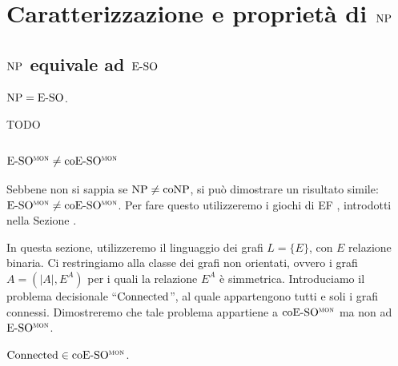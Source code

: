 \chapter{Caratterizzazione e proprietà di $\operatorname{NP}$}

\section{$\operatorname{NP}$ equivale ad $\operatorname{E-SO}$}

\begin{teorema}[Fagin]
  \label{thm:np-eso}
  $\operatorname{NP} = \operatorname{E-SO}$.
\end{teorema}


TODO


\section{$\operatorname{E-SO^{\normalfont\textsc{mon}}} \neq \operatorname{coE-SO^{\normalfont\textsc{mon}}}$}

Sebbene non si sappia se $\operatorname{NP}\neq\operatorname{coNP}$, si può dimostrare un risultato simile: $\operatorname{E-SO^{\normalfont\textsc{mon}}} \neq \operatorname{coE-SO^{\normalfont\textsc{mon}}}$.
Per fare questo utilizzeremo i giochi di EF , introdotti nella Sezione .

% 

In questa sezione, utilizzeremo il linguaggio dei grafi $L=\{E\}$, con $E$ relazione binaria.
Ci restringiamo alla classe dei grafi non orientati, ovvero i grafi $A=(|A|,E^A)$ per i quali la relazione $E^A$ è simmetrica.
Introduciamo il problema decisionale ``$\operatorname{Connected}$'', al quale appartengono tutti e soli i grafi connessi.
Dimostreremo che tale problema appartiene a $\operatorname{coE-SO^{\normalfont\textsc{mon}}}$ ma non ad $\operatorname{E-SO^{\normalfont\textsc{mon}}}$.

\begin{lemma}
  $\operatorname{Connected} \in \operatorname{coE-SO^{\normalfont\textsc{mon}}}$.
\end{lemma}

